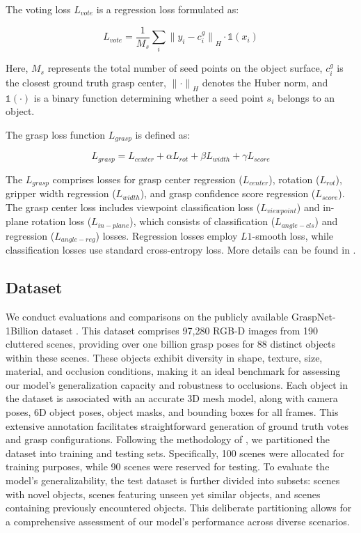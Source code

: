 The voting loss $L_{vote}$ is a regression loss formulated as:

\begin{equation}
L_{vote} = \frac{1}{M_s} \sum_{i}^{} {\lVert y_i - c^g_i \rVert}_H \cdot \mathds{1}(x_i)
\end{equation}

Here, $M_s$ represents the total number of seed points on the object surface, $c^g_i$ is the closest ground truth grasp center, ${\lVert \cdot \rVert}_H$ denotes the Huber norm, and $\mathds{1}(\cdot)$ is a binary function determining whether a seed point $s_i$ belongs to an object.

The grasp loss function $L_{grasp}$ is defined as:

\begin{equation}
L_{grasp} = L_{center} + \alpha L_{rot} + \beta L_{width} + \gamma L_{score}
\end{equation}

The $L_{grasp}$ comprises losses for grasp center regression ($L_{center}$), rotation ($L_{rot}$), gripper width regression ($L_{width}$), and grasp confidence score regression ($L_{score}$). The grasp center loss includes viewpoint classification loss ($L_{viewpoint}$) and in-plane rotation loss ($L_{in-plane}$), which consists of classification ($L_{angle-cls}$) and regression ($L_{angle-reg}$) losses. Regression losses employ $L1$-smooth loss, while classification losses use standard cross-entropy loss. More details can be found in \cite{hoang2023grasp}.

\subsection{Dataset}

We conduct evaluations and comparisons on the publicly available GraspNet-1Billion dataset \cite{fang2020graspnet}. This dataset comprises 97,280 RGB-D images from 190 cluttered scenes, providing over one billion grasp poses for 88 distinct objects within these scenes. These objects exhibit diversity in shape, texture, size, material, and occlusion conditions, making it an ideal benchmark for assessing our model's generalization capacity and robustness to occlusions. Each object in the dataset is associated with an accurate 3D mesh model, along with camera poses, 6D object poses, object masks, and bounding boxes for all frames. This extensive annotation facilitates straightforward generation of ground truth votes and grasp configurations. Following the methodology of \cite{fang2020graspnet}, we partitioned the dataset into training and testing sets. Specifically, 100 scenes were allocated for training purposes, while 90 scenes were reserved for testing. To evaluate the model's generalizability, the test dataset is further divided into subsets: scenes with novel objects, scenes featuring unseen yet similar objects, and scenes containing previously encountered objects. This deliberate partitioning allows for a comprehensive assessment of our model's performance across diverse scenarios.
